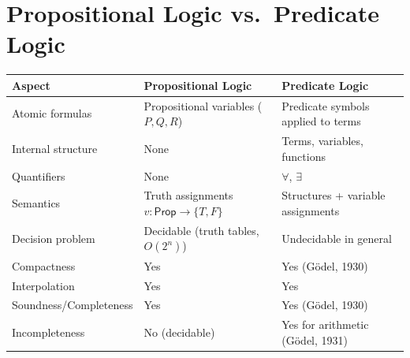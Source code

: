 \section*{Propositional Logic vs.\ Predicate Logic}

\begin{center}
\renewcommand{\arraystretch}{1.3}
\begin{tabular}{p{3.5cm} p{5cm} p{5cm}}
\toprule
\textbf{Aspect} & \textbf{Propositional Logic} & \textbf{Predicate Logic} \\
\midrule
Atomic formulas & Propositional variables ($P, Q, R$) & Predicate symbols applied to terms \\
Internal structure & None & Terms, variables, functions \\
Quantifiers & None & $\forall$, $\exists$ \\
Semantics & Truth assignments $v: \mathsf{Prop}\to\{T,F\}$ & Structures + variable assignments \\
Decision problem & Decidable (truth tables, $O(2^n)$) & Undecidable in general \\
Compactness & Yes & Yes (Gödel, 1930) \\
Interpolation & Yes & Yes \\
Soundness/Completeness & Yes & Yes (Gödel, 1930) \\
Incompleteness & No (decidable) & Yes for arithmetic (Gödel, 1931) \\
\bottomrule
\end{tabular}
\end{center}
